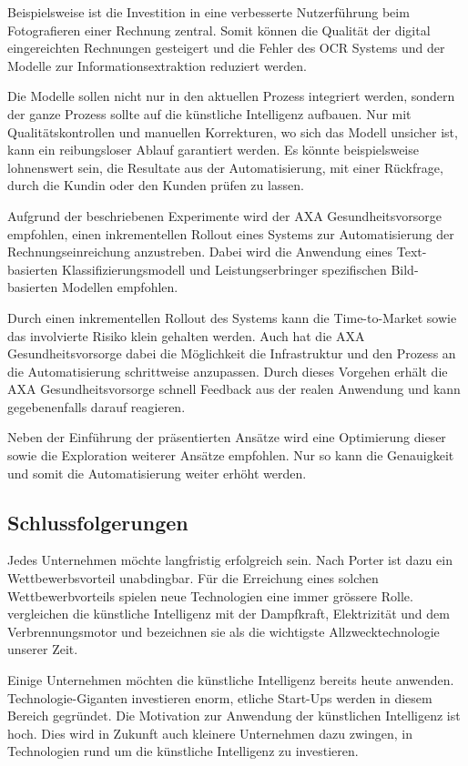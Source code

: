 Beispielsweise ist die Investition in eine verbesserte Nutzerführung beim Fotografieren einer Rechnung zentral. Somit können die Qualität der digital eingereichten Rechnungen gesteigert und die Fehler des OCR Systems und der Modelle zur Informationsextraktion reduziert werden.

Die Modelle sollen nicht nur in den aktuellen Prozess integriert werden, sondern der ganze Prozess sollte auf die künstliche Intelligenz aufbauen. Nur mit Qualitätskontrollen und manuellen Korrekturen, wo sich das Modell unsicher ist, kann ein reibungsloser Ablauf garantiert werden. Es könnte beispielsweise lohnenswert sein, die Resultate aus der Automatisierung, mit einer Rückfrage, durch die Kundin oder den Kunden prüfen zu lassen.

Aufgrund der beschriebenen Experimente wird der AXA Gesundheitsvorsorge empfohlen, einen inkrementellen Rollout eines Systems zur Automatisierung der Rechnungseinreichung anzustreben. Dabei wird die Anwendung eines Text-basierten Klassifizierungsmodell und Leistungserbringer spezifischen Bild-basierten Modellen empfohlen.

Durch einen inkrementellen Rollout des Systems kann die Time-to-Market sowie das involvierte Risiko klein gehalten werden. Auch hat die AXA Gesundheitsvorsorge dabei die Möglichkeit die Infrastruktur und den Prozess an die Automatisierung schrittweise anzupassen. Durch dieses Vorgehen erhält die AXA Gesundheitsvorsorge schnell Feedback aus der realen Anwendung und kann gegebenenfalls darauf reagieren.

Neben der Einführung der präsentierten Ansätze wird eine Optimierung dieser sowie die Exploration weiterer Ansätze empfohlen. Nur so kann die Genauigkeit und somit die Automatisierung weiter erhöht werden.

\subsection{Schlussfolgerungen}

Jedes Unternehmen möchte langfristig erfolgreich sein. Nach Porter ist dazu ein Wettbewerbsvorteil unabdingbar. Für die Erreichung eines solchen Wettbewerbvorteils spielen neue Technologien eine immer grössere Rolle. \textcite{McAfee} vergleichen die künstliche Intelligenz mit der Dampfkraft, Elektrizität und dem Verbrennungsmotor und bezeichnen sie als die wichtigste Allzwecktechnologie unserer Zeit.

Einige Unternehmen möchten die künstliche Intelligenz bereits heute anwenden. Technologie-Giganten investieren enorm, etliche Start-Ups werden in diesem Bereich gegründet. Die Motivation zur Anwendung der künstlichen Intelligenz ist hoch. Dies wird in Zukunft auch kleinere Unternehmen dazu zwingen, in Technologien rund um die künstliche Intelligenz zu investieren.

